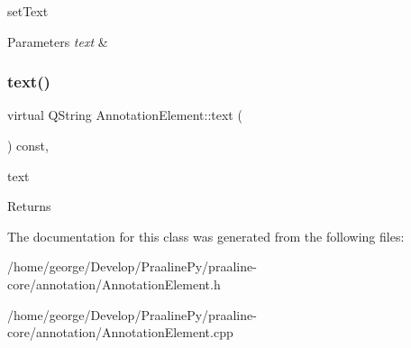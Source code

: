 set\+Text 


\begin{DoxyParams}{Parameters}
{\em text} & \\
\hline
\end{DoxyParams}
\mbox{\label{class_annotation_element_aa59bd98501e3882990681f6aff2ee863}} 
\subsubsection{\texorpdfstring{text()}{text()}}
{\footnotesize\ttfamily virtual Q\+String Annotation\+Element\+::text (\begin{DoxyParamCaption}{ }\end{DoxyParamCaption}) const\hspace{0.3cm}{\ttfamily [inline]}, {\ttfamily [virtual]}}



text 

\begin{DoxyReturn}{Returns}

\end{DoxyReturn}


The documentation for this class was generated from the following files\+:\begin{DoxyCompactItemize}
\item 
/home/george/\+Develop/\+Praaline\+Py/praaline-\/core/annotation/Annotation\+Element.\+h\item 
/home/george/\+Develop/\+Praaline\+Py/praaline-\/core/annotation/Annotation\+Element.\+cpp\end{DoxyCompactItemize}
